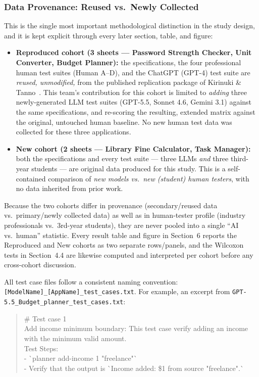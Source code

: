 \documentclass[12pt,a4paper]{article}
\begin{document}
\subsubsection*{Data Provenance: Reused vs.\ Newly Collected}
This is the single most important methodological distinction in the study design, and it is kept explicit through every later section, table, and figure:
\begin{itemize}[leftmargin=1.2cm]
    \item \textbf{Reproduced cohort (3 sheets --- Password Strength Checker, Unit Converter, Budget Planner):} the specifications, the four professional human test suites (Human A--D), and the ChatGPT (GPT-4) test suite are \emph{reused, unmodified,} from the published replication package of Kirinuki \& Tanno~\cite{b1}. This team's contribution for this cohort is limited to \emph{adding} three newly-generated LLM test suites (GPT-5.5, Sonnet 4.6, Gemini 3.1) against the same specifications, and re-scoring the resulting, extended matrix against the original, untouched human baseline. No new human test data was collected for these three applications.
    \item \textbf{New cohort (2 sheets --- Library Fine Calculator, Task Manager):} both the specifications and every test suite --- three LLMs \emph{and} three third-year students --- are original data produced for this study. This is a self-contained comparison of \emph{new models vs.\ new (student) human testers}, with no data inherited from prior work.
\end{itemize}
Because the two cohorts differ in provenance (secondary/reused data vs.\ primary/newly collected data) as well as in human-tester profile (industry professionals vs.\ 3rd-year students), they are never pooled into a single ``AI vs.\ human'' statistic. Every result table and figure in Section~6 reports the Reproduced and New cohorts as two separate rows/panels, and the Wilcoxon tests in Section~4.4 are likewise computed and interpreted per cohort before any cross-cohort discussion.

All test case files follow a consistent naming convention: \texttt{[ModelName]\_[AppName]\_test\_cases.txt}. For example, an excerpt from \texttt{GPT-5.5\_Budget\_planner\_test\_cases.txt}:
\begin{quote}
\small\ttfamily
\# Test case 1\\[2pt]
Add income minimum boundary: This test case verify adding an income with the minimum valid amount.\\
Test Steps:\\[2pt]
- \`{}planner add-income 1 "freelance"\`{}\\
- Verify that the output is \`{}Income added: \$1 from source "freelance".\`{}
\end{quote}
\end{document}

